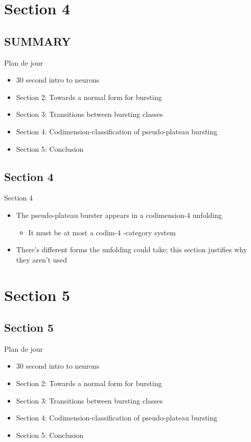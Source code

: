 \documentclass[presentation]{beamer}
\begin{document}
\section{Section 4}
\label{sec:orga660b2f}
\subsection{SUMMARY}
\label{sec:orgff164d7}
\begin{frame}[label={sec:orgc2a0426}]{Plan de jour}
\begin{itemize}
\item 30 second intro to neurons
\item Section 2: Towards a normal form for bursting
\item Section 3: Transitions between bursting classes
\item \alert{Section 4: Codimension-classification of pseudo-plateau bursting}
\item Section 5: Conclusion
\end{itemize}
\end{frame}

\subsection{Section 4}
\label{sec:org4b108c1}
\begin{frame}[label={sec:orgf7dcbca}]{Section 4}
\begin{itemize}
\item The pseudo-plateau burster appears in a codimension-4 unfolding
\begin{itemize}
\item It must be at most a codim-4 -category system
\end{itemize}
\item There's different forms the unfolding could take; this section justifies why they aren't used
\end{itemize}
\end{frame}


\section{Section 5}
\label{sec:orgae844eb}
\subsection{Section 5}
\label{sec:orgfe248d9}
\begin{frame}[label={sec:org91cd3de}]{Plan de jour}
\begin{itemize}
\item 30 second intro to neurons
\item Section 2: Towards a normal form for bursting
\item Section 3: Transitions between bursting classes
\item Section 4: Codimension-classification of pseudo-plateau bursting
\item \alert{Section 5: Conclusion}
\end{itemize}
\end{frame}
\end{document}
